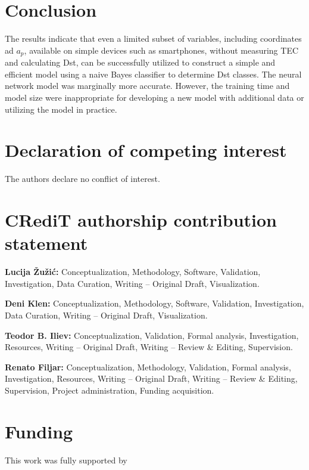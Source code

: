 \documentclass[preprint,12pt]{elsarticle}
\begin{document}
\section{Conclusion}

The results indicate that even a limited subset of variables, including coordinates ad $a_{p}$, available on simple devices such as smartphones, without measuring TEC and calculating Dst, can be successfully utilized to construct a simple and efficient model using a naive Bayes classifier to determine Dst classes. The neural network model was marginally more accurate. However, the training time and model size were inappropriate for developing a new model with additional data or utilizing the model in practice.


\section*{Declaration of competing interest}

The authors declare no conflict of interest.

\section*{CRediT authorship contribution statement}

\textbf{Lucija \v{Z}u\v{z}i\'{c}:} Conceptualization, Methodology, Software, Validation, Investigation, Data Curation, Writing -- Original Draft, Visualization. 

\textbf{Deni Klen:} Conceptualization, Methodology, Software, Validation, Investigation, Data Curation, Writing -- Original Draft, Visualization. 

\textbf{Teodor B. Iliev:} Conceptualization,  Validation, Formal analysis, Investigation, Resources, Writing -- Original Draft, Writing -- Review \& Editing, Supervision. 

\textbf{Renato Filjar:} Conceptualization, Methodology, Validation, Formal analysis, Investigation, Resources, Writing -- Original Draft, Writing -- Review \& Editing, Supervision, Project administration, Funding acquisition.


\section*{Funding}

This work was fully supported by



\end{document}
